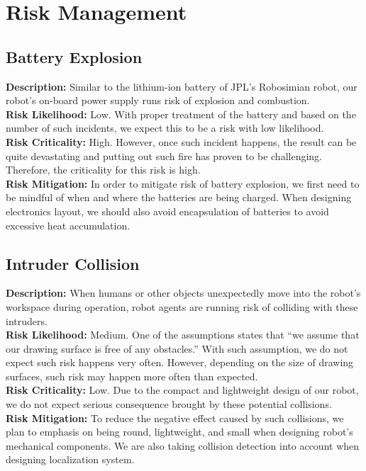 
\section{Risk Management}
\label{sec:risk}

\subsection{Battery Explosion}
\textbf{Description:} Similar to the lithium-ion battery of JPL’s Robosimian robot, our robot’s on-board power supply runs risk of explosion and combustion.\\
\textbf{Risk Likelihood:} Low. With proper treatment of the battery and based on the number of such incidents, we expect this to be a risk with low likelihood.\\
\textbf{Risk Criticality:} High. However, once such incident happens, the result can be quite devastating and putting out such fire has proven to be challenging. Therefore, the criticality for this risk is high.\\
\textbf{Risk Mitigation:} In order to mitigate risk of battery explosion, we first need to be mindful of when and where the batteries are being charged. When designing electronics layout, we should also avoid encapsulation of batteries to avoid excessive heat accumulation.

\subsection{Intruder Collision}
\textbf{Description:} When humans or other objects unexpectedly move into the robot’s workspace during operation, robot agents are running risk of colliding with these intruders.\\
\textbf{Risk Likelihood:} Medium. One of the assumptions states that “we assume that our drawing surface is free of any obstacles.” With such assumption, we do not expect such risk happens very often. However, depending on the size of drawing surfaces, such risk may happen more often than expected.\\
\textbf{Risk Criticality:} Low. Due to the compact and lightweight design of our robot, we do not expect serious consequence brought by these potential collisions.\\
\textbf{Risk Mitigation:} To reduce the negative effect caused by such collisions, we plan to emphasis on being round, lightweight, and small when designing robot’s mechanical components. We are also taking collision detection into account when designing localization system.

